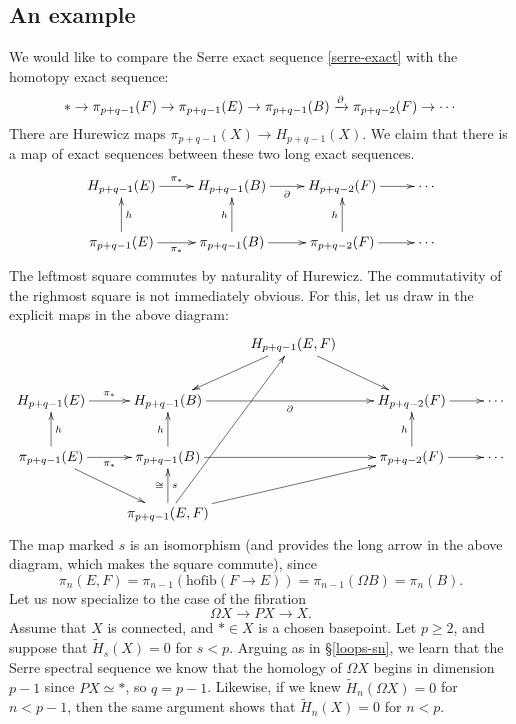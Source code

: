 \subsection{An example}
We would like to compare the Serre exact sequence \eqref{serre-exact} with the
homotopy exact sequence:
$$\ast\to \pi_{p+q-1}(F)\to \pi_{p+q-1}(E)\to \pi_{p+q-1}(B)\xrightarrow{{\partial}}
\pi_{p+q-2}(F)\to \cdots$$
There are Hurewicz maps $\pi_{p+q-1}(X)\to H_{p+q-1}(X)$. We claim that there
is a map of exact sequences between these two long exact sequences.
\begin{equation*}
    \xymatrix{
	H_{p+q-1}(E) \ar[r]^{\pi_\ast} & H_{p+q-1}(B)\ar[r]_\partial &
	H_{p+q-2}(F)\ar[r] & \cdots\\
	\pi_{p+q-1}(E)\ar[r]_{\pi_\ast}\ar[u]_{h} &
	\pi_{p+q-1}(B)\ar[u]^h\ar[r] & \pi_{p+q-2}(F)\ar[r]\ar[u]^h &
	\cdots\\
    }
\end{equation*}
The leftmost square commutes by naturality of Hurewicz. The commutativity of
the righmost square is not immediately obvious. For this, let us draw in the
explicit maps in the above diagram:
\begin{equation*}
    \xymatrix{
	& & H_{p+q-1}(E,F)\ar[dl]\ar[dr] & &\\
	H_{p+q-1}(E) \ar[r]^{\pi_\ast} & H_{p+q-1}(B)\ar[rr]_\partial & &
	H_{p+q-2}(F)\ar[r] & \cdots\\
	\pi_{p+q-1}(E)\ar[r]_{\pi_\ast}\ar[dr]\ar[u]_{h} &
	\pi_{p+q-1}(B)\ar[u]^h\ar[rr] & & \pi_{p+q-2}(F)\ar[r]\ar[u]^h &
	\cdots\\
	& \pi_{p+q-1}(E,F)\ar[uuur]\ar[urr]\ar[u]^\cong_{s} & &
    }
\end{equation*}
The map marked $s$ is an isomorphism (and provides the long arrow in the above
diagram, which makes the square commute), since
$$
\pi_n(E,F) = \pi_{n-1}(\mathrm{hofib}(F\to E)) = \pi_{n-1}(\Omega B) =
\pi_n(B).
$$
Let us now specialize to the case of the fibration
$$\Omega X\to PX\to X.$$
Assume that $X$ is connected, and $\ast \in X$ is a chosen basepoint. Let
$p\geq 2$, and suppose that $\widetilde{H}_s(X) = 0$ for $s<p$. Arguing as in
\S \ref{loops-sn}, we learn that the Serre spectral sequence we know that the
homology of $\Omega X$ begins in dimension $p-1$ since $PX\simeq \ast$, so $q =
p-1$. Likewise, if we knew $\widetilde{H}_n(\Omega X) = 0$ for $n<p-1$, then
the same argument shows that $\widetilde{H}_n(X) = 0$ for $n<p$.
